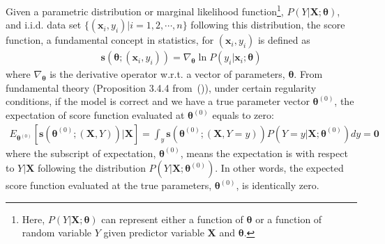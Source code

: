 \documentclass[twoside,11pt]{article}
\begin{document}
Given a parametric distribution or {marginal} likelihood function\footnote{Here, $P(Y|\bm{X};\bm{\theta})$ can represent either a function of $\bm { \theta}$ or a function of random variable $Y$ given predictor variable $\bm {X}$ and $\bm { \theta}$.}, {$P(Y | \bm {X}; \bm{\theta})$}, and i.i.d. data set $\{(\bm {x}_i, y_i) | i = 1,2, \cdots, n\}$ following this distribution, the score function, a fundamental concept in statistics, for $ (\bm {x}_i, y_i)$ is defined as 
\begin{align}
\bm{s}(\bm { \theta}; (\bm {x}_i, y_i)) = \nabla _{\bm { \theta}} { \ln {P(y_i | \bm {x}_i; \bm{\theta})}}
\label{eqn:score_func}
\end{align}
where $\nabla _{\bm { \theta}}$ is the derivative operator w.r.t. a vector of parameters, $\bm {\theta}$. From fundamental theory (Proposition 3.4.4 from~(\cite{bickel2015mathematical})), under certain regularity conditions, if the model is correct and we have a true parameter vector {$\bm { \theta} ^{ (0)}$}, the expectation of score function evaluated at $\bm { \theta} ^{ (0)}$ equals to zero:
\begin{align}
E_{\bm { \theta} ^{ (0)}}[\bm{s}(\bm { \theta}^{ (0)};(\bm {X}, Y))|\bm {X}] = \int_{y}\bm{s}(\bm { \theta}^{ (0)};(\bm {X}, Y=y))P(Y=y|\bm{X};\bm{\theta}^{(0)})dy = \bm{0}
\label{eqn:score_exp_zero}
\end{align}
where the subscript of expectation, $\bm { \theta} ^{ (0)}$, means the expectation is with respect to $Y|\bm{X}$ following the distribution $P(Y|\bm{X};\bm{\theta}^{(0)})$. In other words, the expected score function evaluated at the true parameters, $\bm { \theta} ^{ (0)}$, is identically zero.
\end{document}
